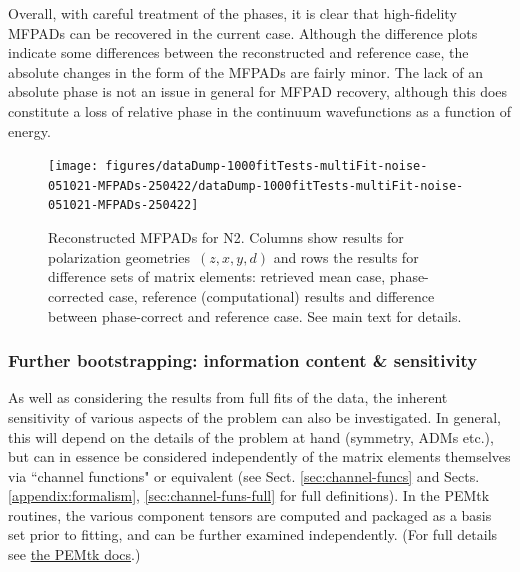 \documentclass[10pt]{article}
\begin{document}
Overall, with careful treatment of the phases, it is clear that high-fidelity MFPADs can be recovered in the current case. Although the difference plots indicate some differences between the reconstructed and reference case, the absolute changes in the form of the MFPADs are fairly minor. The lack of an absolute phase is not an issue in general for MFPAD recovery, although this does constitute a loss of relative phase in the continuum wavefunctions as a function of energy. %

\begin{figure}[H]
\begin{center}
\texttt{[image: figures/dataDump-1000fitTests-multiFit-noise-051021-MFPADs-250422/dataDump-1000fitTests-multiFit-noise-051021-MFPADs-250422]}
\caption{{Reconstructed MFPADs for N2. Columns show results for polarization
geometries~\((z,x,y,d)\) and rows the results for difference sets
of matrix elements: retrieved mean case, phase-corrected case, reference
(computational) results and difference between phase-correct and
reference case. See main text for details.
{\label{454268}}%
}}
\end{center}
\end{figure}

\subsubsection{Further bootstrapping: information content \& sensitivity\label{sec:bootstrapping-info-sensitivity}}

As well as considering the results from full fits of the data, the inherent sensitivity of various aspects of the problem can also be investigated. In general, this will depend on the details of the problem at hand (symmetry, ADMs etc.), but can in essence be considered independently of the matrix elements themselves via ``channel functions" or equivalent (see Sect. \ref{sec:channel-funcs} and Sects. \ref{appendix:formalism}, \ref{sec:channel-funs-full} for full definitions). In the PEMtk routines, the various component tensors are computed and packaged as a basis set prior to fitting, and can be further examined independently. (For full details see \href{https://pemtk.readthedocs.io/en/latest/fitting/PEMtk_fitting_basis-set_demo_050621-full.html}{the PEMtk docs}.)
\end{document}
